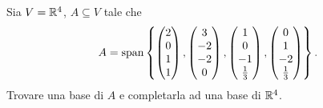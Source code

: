 \begin{example}
    Sia $V = \mathbb{R}^4$, $A \subseteq V$ tale che \[
        A = \operatorname{span}\left\{\begin{pmatrix}2\\0\\1\\1\end{pmatrix}, \begin{pmatrix}3\\-2\\-2\\0\end{pmatrix}, \begin{pmatrix}1\\0\\-1\\\frac13\end{pmatrix}, \begin{pmatrix}0\\1\\-2\\\frac13\end{pmatrix}\right\}.    
    \] Trovare una base di $A$ e completarla ad una base di $\mathbb{R}^4$.
\end{example}
